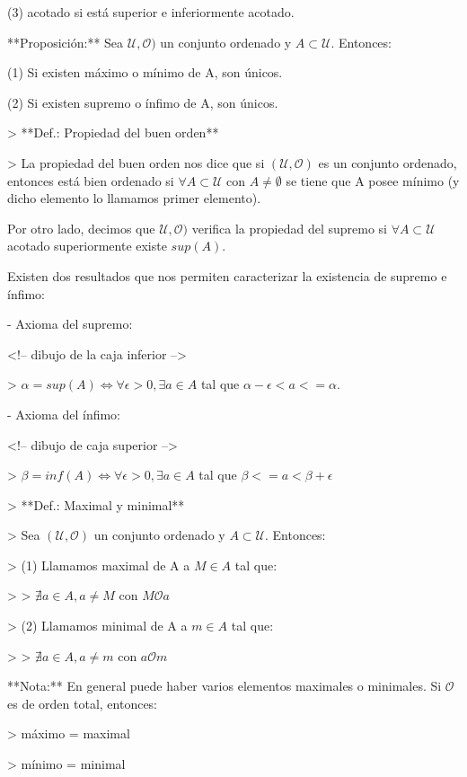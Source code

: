 (3) acotado si está superior e inferiormente acotado.

**Proposición:** Sea $\mathcal{U},\mathcal{O})$ un conjunto ordenado y $A \subset \mathcal{U}$. Entonces:

(1) Si existen máximo o mínimo de A, son únicos.

(2) Si existen supremo o ínfimo de A, son únicos.

> **Def.: Propiedad del buen orden**

> La propiedad del buen orden nos dice que si $(\mathcal{U},\mathcal{O})$ es un conjunto ordenado, entonces está bien ordenado si $\forall A \subset \mathcal{U}$ con $A \neq \emptyset$ se tiene que A posee mínimo (y dicho elemento lo llamamos primer elemento).

Por otro lado, decimos que $\mathcal{U},\mathcal{O})$ verifica la propiedad del supremo si $\forall A \subset \mathcal{U}$ acotado superiormente existe $sup(A)$.

Existen dos resultados que nos permiten caracterizar la existencia de supremo e ínfimo:

- Axioma del supremo:

<!--
dibujo de la caja inferior
-->

> $\alpha = sup(A) \iff \forall \epsilon > 0, \exists a \in A$ tal que $\alpha - \epsilon < a <= \alpha$.

- Axioma del ínfimo:

<!--
dibujo de caja superior
-->

> $\beta = inf(A) \iff \forall \epsilon > 0, \exists a \in A$ tal que $\beta <= a < \beta + \epsilon$

> **Def.: Maximal y minimal**

> Sea $(\mathcal{U},\mathcal{O})$ un conjunto ordenado y $A \subset \mathcal{U}$. Entonces:

> (1) Llamamos maximal de A a $M \in A$ tal que:

> > $\nexists a \in A, a \neq M$ con $M \mathcal{O} a$

> (2) Llamamos minimal de A a $m \in A$ tal que:

> > $\nexists a \in A, a \neq m$ con $a \mathcal{O} m$

**Nota:** En general puede haber varios elementos maximales o minimales. Si $\mathcal{O}$ es de orden total, entonces:

> máximo = maximal

> mínimo = minimal


